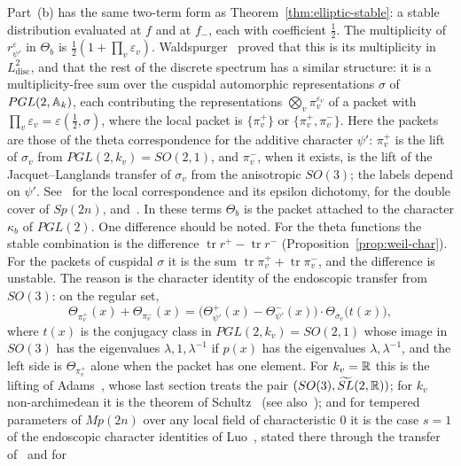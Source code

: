Part~(b) has the same two-term form as Theorem~\ref{thm:elliptic-stable}: a
stable distribution evaluated at $f$ and at $f_-$, each with coefficient
$\frac12$. The multiplicity of $r^\varepsilon_{\psi'}$ in $\Theta_b$ is
$\frac12(1+\prod_v\varepsilon_v)$. Waldspurger~\cite{Wa80,Wa91} proved
that this is its multiplicity in $L^2_{\mathrm{disc}}$, and that the rest
of the discrete spectrum has a similar structure: it is a
multiplicity-free sum over the cuspidal automorphic representations
$\sigma$ of $PGL(2,\mathbb{A}_k)$, each contributing the representations
$\bigotimes_v\pi_v^{\varepsilon_v}$ of a packet with $\prod_v\varepsilon_v=
\varepsilon(\frac12,\sigma)$, where the local packet is $\{\pi_v^+\}$ or
$\{\pi_v^+,\pi_v^-\}$. Here the packets are those of the theta
correspondence for the additive character $\psi'$: $\pi_v^+$ is the lift
of $\sigma_v$ from $PGL(2,k_v)=SO(2,1)$, and $\pi_v^-$, when it exists, is
the lift of the Jacquet--Langlands transfer of $\sigma_v$ from the
anisotropic $SO(3)$; the labels depend on $\psi'$. See~\cite{GS12} for the
local correspondence and its epsilon dichotomy, \cite{GI18} for the double
cover of $Sp(2n)$, and~\cite{Li24}. In these terms $\Theta_b$
is the packet attached to the character $\kappa_b$ of $PGL(2)$. One
difference should be noted. For the theta functions the stable
combination is the difference $\operatorname{tr}r^+-\operatorname{tr}r^-$
(Proposition~\ref{prop:weil-char}). For the packets of cuspidal $\sigma$
it is the sum $\operatorname{tr}\pi^+_v+\operatorname{tr}\pi^-_v$, and the
difference is unstable. The reason is the character identity of the
endoscopic transfer from $SO(3)$: on the regular set,
\begin{equation}\label{eq:packet-lift}
\Theta_{\pi^+_v}(x)+\Theta_{\pi^-_v}(x)=\bigl(\Theta^+_{\psi'}(x)-
\Theta^-_{\psi'}(x)\bigr)\cdot\Theta_{\sigma_v}\bigl(t(x)\bigr),
\end{equation}
where $t(x)$ is the conjugacy class in $PGL(2,k_v)=SO(2,1)$ whose image
in $SO(3)$ has the eigenvalues $\lambda,1,\lambda^{-1}$ if $p(x)$ has the
eigenvalues $\lambda,\lambda^{-1}$, and the left side is
$\Theta_{\pi^+_v}$ alone when the packet has one element. For $k_v=\mathbb{R}$
this is the lifting of Adams~\cite{Ad98}, whose last section treats the
pair $(SO(3),\widetilde{SL}(2,\mathbb{R}))$; for $k_v$ non-archimedean it is the
theorem of Schultz~\cite[Theorem~5.35]{Sc98} (see also~\cite{Ho10}); and
for tempered parameters of $Mp(2n)$ over any local field of characteristic
$0$ it is the case $s=1$ of the endoscopic character identities of
Luo~\cite{Lu20}, stated there through the transfer of~\cite{Li11} and for
